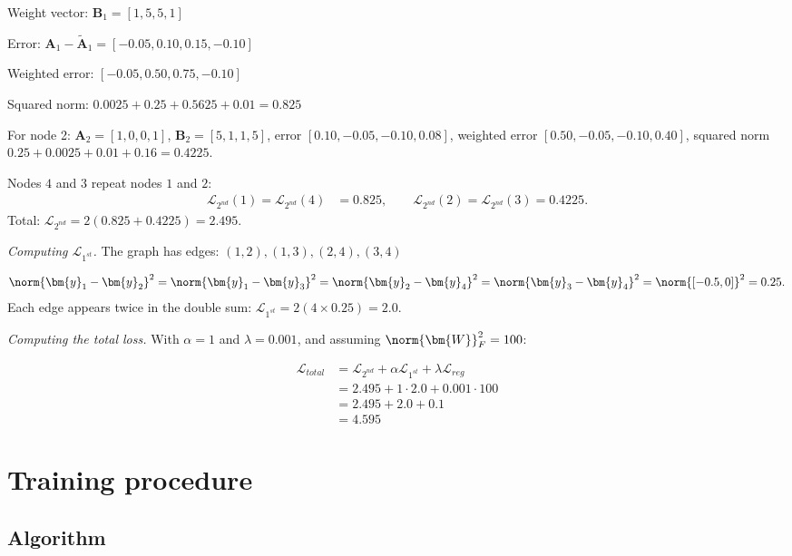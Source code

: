 \begin{notechapter}
\begin{example}
Weight vector: $\bm{B}_1 = [1, 5, 5, 1]$

Error: $\bm{A}_1 - \tilde{\bm{A}}_1 = [-0.05, 0.10, 0.15, -0.10]$

Weighted error: $[-0.05, 0.50, 0.75, -0.10]$

Squared norm: $0.0025 + 0.25 + 0.5625 + 0.01 = 0.825$

For node 2: $\bm{A}_2 = [1, 0, 0, 1]$, $\bm B_2 = [5, 1, 1, 5]$, error $[0.10, -0.05, -0.10, 0.08]$, weighted error $[0.50, -0.05, -0.10, 0.40]$, squared norm $0.25 + 0.0025 + 0.01 + 0.16 = 0.4225$.

Nodes $4$ and $3$ repeat nodes $1$ and $2$:
\begin{align*}
\mathcal{L}_{2^{nd}}(1) = \mathcal{L}_{2^{nd}}(4) &= 0.825, \qquad
\mathcal{L}_{2^{nd}}(2) = \mathcal{L}_{2^{nd}}(3) = 0.4225 .
\end{align*}
Total: $\mathcal{L}_{2^{nd}} = 2(0.825 + 0.4225) = 2.495$.

\emph{Computing $\mathcal{L}_{1^{st}}$.}
The graph has edges: $(1,2), (1,3), (2,4), (3,4)$

\begin{align*}
\norm{\bm{y}_1 - \bm{y}_2}^2 = \norm{\bm{y}_1 - \bm{y}_3}^2 = \norm{\bm{y}_2 - \bm{y}_4}^2 = \norm{\bm{y}_3 - \bm{y}_4}^2 = \norm{[-0.5, 0]}^2 = 0.25 .
\end{align*}
Each edge appears twice in the double sum: $\mathcal{L}_{1^{st}} = 2(4\times0.25) = 2.0$.

\emph{Computing the total loss.}
With $\alpha = 1$ and $\lambda = 0.001$, and assuming $\norm{\bm{W}}^2_F = 100$:

\begin{align*}
\mathcal{L}_{total} &= \mathcal{L}_{2^{nd}} + \alpha \mathcal{L}_{1^{st}} + \lambda \mathcal{L}_{reg} \\
&= 2.495 + 1 \cdot 2.0 + 0.001 \cdot 100 \\
&= 2.495 + 2.0 + 0.1 \\
&= 4.595
\end{align*}
\end{example}

\section{Training procedure}

\subsection{Algorithm}


\end{notechapter}
